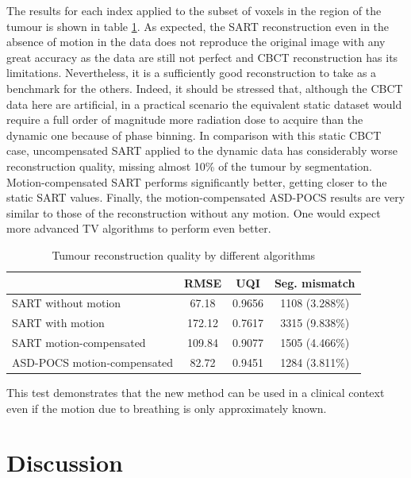 The results for each index applied to the subset of voxels in the region of the tumour is shown in table \ref{tab:quality}.  As expected, the SART reconstruction even in the absence of motion in the data does not reproduce the original image with any great accuracy as the data are still not perfect and CBCT reconstruction has its limitations.  Nevertheless, it is a sufficiently good reconstruction to take as a benchmark for the others.  Indeed, it should be stressed that, although the CBCT data here are artificial, in a practical scenario the equivalent static dataset would require a full order of magnitude more radiation dose to acquire than the dynamic one because of phase binning.  In comparison with this static CBCT case, uncompensated SART applied to the dynamic data has considerably worse reconstruction quality, missing almost 10\% of the tumour by segmentation.  Motion-compensated SART performs significantly better, getting closer to the static SART values.  Finally, the motion-compensated ASD-POCS results are very similar to those of the reconstruction without any motion.  One would expect more advanced TV algorithms to perform even better.
  
\begin{table}[H]
\begin{center}
\caption{Tumour reconstruction quality by different algorithms}
\label{tab:quality}
\begin{tabular}{|l|| c | c | c |}
\hline
 & RMSE & UQI & Seg. mismatch \\
\hline \hline  
 SART without motion & 67.18 & 0.9656 & 1108 (3.288\%)\\
 SART with motion & 172.12 & 0.7617 & 3315 (9.838\%)\\
 SART motion-compensated & 109.84 & 0.9077 & 1505 (4.466\%)\\
 ASD-POCS motion-compensated & 82.72 & 0.9451 & 1284 (3.811\%)\\
\hline  
\end{tabular}
\end{center}
\end{table}

This test demonstrates that the new method can be used in a clinical context even if the motion due to breathing is only approximately known.



\section{Discussion}

